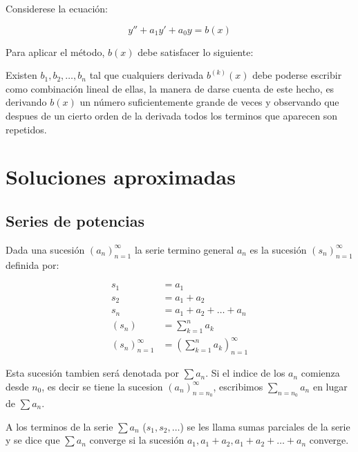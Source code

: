 		\begin{observacion}
			Considerese la ecuación:

			\begin{equation}
				y'' + a_1 y' + a_0 y = b(x)
			\end{equation}

			Para aplicar el método, $b(x)$ debe satisfacer lo siguiente:

			Existen $b_1, b_2, \dots, b_n$ tal que cualquiers derivada $b^{(k)}(x)$ debe poderse escribir como combinación lineal de ellas, la manera de darse cuenta de este hecho, es derivando $b(x)$ un número suficientemente grande de veces y observando que despues de un cierto orden de la derivada todos los terminos que aparecen son repetidos.
		\end{observacion}

\newpage
\section{Soluciones aproximadas}

	\subsection{Series de potencias}

		\begin{definicion}
			Dada una sucesión $(a_n)_{n=1}^{\infty}$ la serie termino general $a_n$ es la sucesión $(s_n)_{n=1}^{\infty}$ definida por:

			\begin{align*}
				s_1 &= a_1 \\
				s_2 &= a_1 + a_2 \\
				s_n &= a_1 + a_2 + \dots + a_n \\
				(s_n) &= \sum_{k=1}^n a_k \\
				(s_n)_{n=1}^{\infty} &= \left( \sum_{k=1}^{n} a_k \right)_{n=1}^{\infty}
			\end{align*}

			Esta sucesión tambien será denotada por $\sum a_n$.
			Si el indice de los $a_n$ comienza desde $n_0$, es decir se tiene la sucesion $(a_n)_{n=n_0}^{\infty}$, escribimos $\sum_{n=n_0} a_n$ en lugar de $\sum a_n$.

			A los terminos de la serie $\sum a_n$ ($s_1, s_2, \dots$) se les llama sumas parciales de la serie y se dice que $\sum a_n$ converge si la sucesión $a_1, a_1 + a_2,  a_1 + a_2 + \dots + a_n$ converge.
		\end{definicion}

